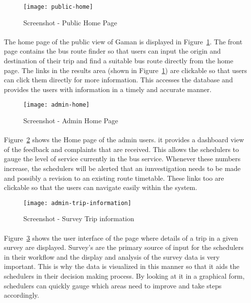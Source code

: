 \begin {figure} [H]
\centering
\texttt{[image: public-home]}
\caption [Screenshot - Public Home Page] {Screenshot - Public Home Page}
\label {image-public-home}
\end {figure}

\paragraph{} The home page of the public view of Gaman is displayed in Figure~\ref{image-public-home}. The front page contains the bus route finder so that users can input the origin and destination of their trip and find a suitable bus route directly from the home page. The links in the results area (shown in Figure~\ref{image-public-home}) are clickable so that users can click them directly for more information. This accesses the database and provides the users with information in a timely and accurate manner.

\begin {figure} [H]
\centering
\texttt{[image: admin-home]}
\caption [Screenshot - Admin Home Page] {Screenshot - Admin Home Page}
\label {image-admin-home}
\end {figure}

\paragraph{} Figure~\ref{image-admin-home} shows the Home page of the admin users. it provides a dashboard view of the feedback and complaints that are received. This allows the schedulers to gauge the level of service currently in the bus service. Whenever these numbers increase, the schedulers will be alerted that an iunvestigation needs to be made and possibly a revision to an existing route timetable. These links too are clickable so that the users can navigate easily within the system.

\begin {figure} [H]
\centering
\texttt{[image: admin-trip-information]}
\caption [Screenshot - Survey Trip information] {Screenshot - Survey Trip information}
\label {image-admin-trip-information}
\end {figure}

\paragraph{} Figure~\ref{image-admin-trip-information} shows the user interface of the page where details of a trip in a given survey are displayed. Survey's are the primary source of input for the schedulers in their workflow and the display and analysis of the survey data is very important. This is why the data is visualized in this manner so that it aids the schedulers in their decision making process. By looking at it in a graphical form, schedulers can quickly gauge which areas need to improve and take steps accordingly.


